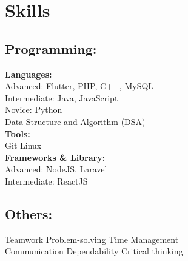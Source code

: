 \documentclass[]{deedy-resume-openfont}
\begin{document}
%
%

%
%

%
%

\begin{minipage}[t]{0.4\textwidth} 


\section{Skills}
\subsection{Programming:}
\sectionsep
\textbf{Languages:}\\
\textbullet{} Advanced: Flutter, PHP, C++, MySQL\\
\textbullet{} Intermediate: Java, JavaScript\\
\textbullet{} Novice: Python\\
Data Structure and Algorithm (DSA)\\

\textbf{Tools:}\\
\textbullet{} Git \textbullet{} Linux\\

\textbf{Frameworks \& Library:} \\
\textbullet{} Advanced: NodeJS, Laravel \\
\textbullet{} Intermediate: ReactJS \\

\subsection{Others:}
\sectionsep
Teamwork \textbullet{} Problem-solving \textbullet{} Time Management\\ Communication \textbullet{} Dependability \textbullet{} Critical thinking
\sectionsep


\end{minipage}
\end{document}
